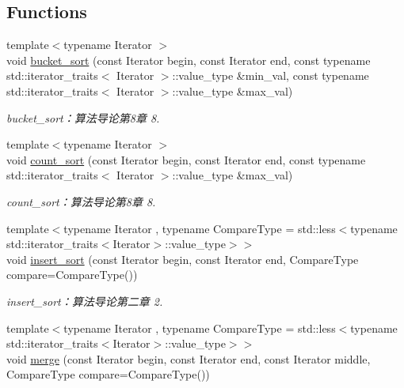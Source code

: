 \subsection*{Functions}
\begin{DoxyCompactItemize}
\item 
{\footnotesize template$<$typename Iterator $>$ }\\void \hyperlink{namespace_introduction_to_algorithm_1_1_sort_algorithm_a1c3f0138b22c1e0c0bbfa67490ec51f1}{bucket\+\_\+sort} (const Iterator begin, const Iterator end, const typename std\+::iterator\+\_\+traits$<$ Iterator $>$\+::value\+\_\+type \&min\+\_\+val, const typename std\+::iterator\+\_\+traits$<$ Iterator $>$\+::value\+\_\+type \&max\+\_\+val)
\begin{DoxyCompactList}\small\item\em bucket\+\_\+sort：算法导论第8章 8. \end{DoxyCompactList}\item 
{\footnotesize template$<$typename Iterator $>$ }\\void \hyperlink{namespace_introduction_to_algorithm_1_1_sort_algorithm_af51ff6ca75d6dccb1add1ad92a5d32fb}{count\+\_\+sort} (const Iterator begin, const Iterator end, const typename std\+::iterator\+\_\+traits$<$ Iterator $>$\+::value\+\_\+type \&max\+\_\+val)
\begin{DoxyCompactList}\small\item\em count\+\_\+sort：算法导论第8章 8. \end{DoxyCompactList}\item 
{\footnotesize template$<$typename Iterator , typename Compare\+Type  = std\+::less$<$typename std\+::iterator\+\_\+traits$<$\+Iterator$>$\+::value\+\_\+type$>$$>$ }\\void \hyperlink{namespace_introduction_to_algorithm_1_1_sort_algorithm_a363c47d6d0dad2f1217b08d355e81126}{insert\+\_\+sort} (const Iterator begin, const Iterator end, Compare\+Type compare=Compare\+Type())
\begin{DoxyCompactList}\small\item\em insert\+\_\+sort：算法导论第二章 2. \end{DoxyCompactList}\item 
{\footnotesize template$<$typename Iterator , typename Compare\+Type  = std\+::less$<$typename std\+::iterator\+\_\+traits$<$\+Iterator$>$\+::value\+\_\+type$>$$>$ }\\void \hyperlink{namespace_introduction_to_algorithm_1_1_sort_algorithm_a4806cf41bd25ff1d1344d858a7a5b577}{merge} (const Iterator begin, const Iterator end, const Iterator middle, Compare\+Type compare=Compare\+Type())

\end{DoxyCompactItemize}
